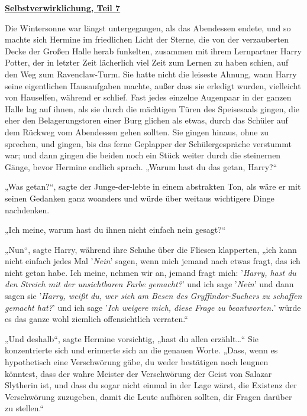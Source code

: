 

\hypertarget{selbstverwirklichung-teil-7}{%

\textbf{\uline{Selbstverwirklichung, Teil 7}}

Die Wintersonne war längst untergegangen, als das Abendessen endete, und so machte sich Hermine im friedlichen Licht der Sterne, die von der verzauberten Decke der Großen Halle herab funkelten, zusammen mit ihrem Lernpartner Harry Potter, der in letzter Zeit lächerlich viel Zeit zum Lernen zu haben schien, auf den Weg zum Ravenclaw-Turm. Sie hatte nicht die leiseste Ahnung, wann Harry seine eigentlichen Hausaufgaben machte, außer dass sie erledigt wurden, vielleicht von Hauselfen, während er schlief. Fast jedes einzelne Augenpaar in der ganzen Halle lag auf ihnen, als sie durch die mächtigen Türen des Speisesaals gingen, die eher den Belagerungstoren einer Burg glichen als etwas, durch das Schüler auf dem Rückweg vom Abendessen gehen sollten. Sie gingen hinaus, ohne zu sprechen, und gingen, bis das ferne Geplapper der Schülergespräche verstummt war; und dann gingen die beiden noch ein Stück weiter durch die steinernen Gänge, bevor Hermine endlich sprach. „Warum hast du das getan, Harry?“

„Was getan?“, sagte der Junge-der-lebte in einem abstrakten Ton, als wäre er mit seinen Gedanken ganz woanders und würde über weitaus wichtigere Dinge nachdenken.

„Ich meine, warum hast du ihnen nicht einfach nein gesagt?“

„Nun“, sagte Harry, während ihre Schuhe über die Fliesen klapperten, „ich kann nicht einfach jedes Mal '\emph{Nein}' sagen, wenn mich jemand nach etwas fragt, das ich nicht getan habe. Ich meine, nehmen wir an, jemand fragt mich: '\emph{Harry, hast du den Streich mit der unsichtbaren Farbe gemacht?}' und ich sage '\emph{Nein}' und dann sagen sie '\emph{Harry, weißt du, wer sich am Besen des Gryffindor-Suchers zu schaffen gemacht hat?}' und ich sage '\emph{Ich weigere mich, diese Frage zu beantworten.}' würde es das ganze wohl ziemlich offensichtlich verraten.“

„Und deshalb“, sagte Hermine vorsichtig, „hast du allen erzählt…“ Sie konzentrierte sich und erinnerte sich an die genauen Worte. „Dass, wenn es hypothetisch eine Verschwörung gäbe, du weder bestätigen noch leugnen könntest, dass der wahre Meister der Verschwörung der Geist von Salazar Slytherin ist, und dass du sogar nicht einmal in der Lage wärst, die Existenz der Verschwörung zuzugeben, damit die Leute aufhören sollten, dir Fragen darüber zu stellen.“

}

